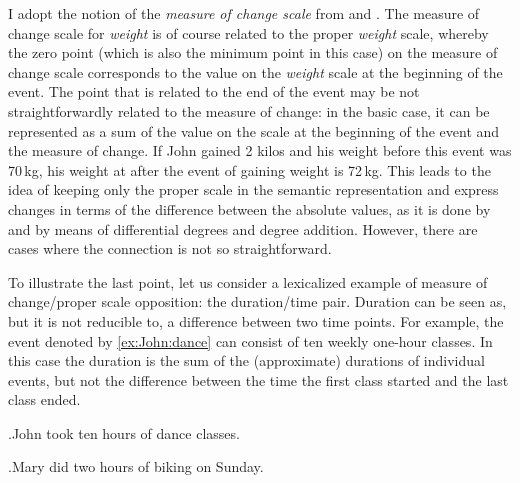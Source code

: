 I adopt the notion of the \textit{measure of change scale} from \citet{KennedyLevin:08} and \citet{Kennedy:12}. The measure of change scale for \textit{weight} is of course related to the proper \textit{weight} scale, whereby the zero point (which is also the minimum point in this case) on the measure of change scale corresponds to the value on the \textit{weight} scale at the beginning of the event. The point that is related to the end of the event may be not straightforwardly related to the measure of change: in the basic case, it can be represented as a sum of the value on the scale at the beginning of the event and the measure of change. If John gained 2 kilos and his weight before this event was 70\,kg, his weight at after the event of gaining weight is 72\,kg. This leads to the idea of keeping only the proper scale in the semantic representation and express changes in terms of the difference between the absolute values, as it is done by \citet{Kennedy:01} and \citet{KennedyLevin:02} by means of differential degrees and degree addition. However, there are cases where the connection is not so straightforward.

To illustrate the last point, let us consider a lexicalized example of measure of change/proper scale opposition: the duration/time pair. Duration can be seen as, but it is not reducible to, a difference between two time points. For example, the event denoted by \ref{ex:John:dance} can consist of ten weekly one-hour classes. In this case the duration is the sum of the (approximate) durations of individual events, but not the difference between the time the first class started and the last class ended. 

\ex.\label{ex:John:dance}John took ten hours of dance classes.

\ex.\label{ex:Mary:bike}Mary did two hours of biking on Sunday. 

